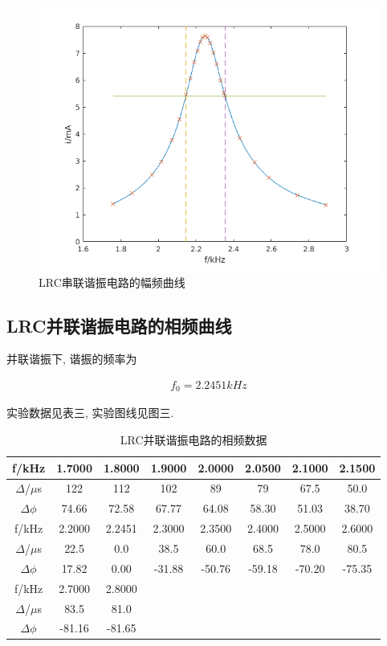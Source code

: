 \documentclass[a4paper,12pt,notitlepage]{article}
\begin{document}
\begin{figure}[H]
\centering
	\includegraphics[scale=0.7]{exp14_2.png}
	\caption{LRC串联谐振电路的幅频曲线}
\end{figure}

\subsection{LRC并联谐振电路的相频曲线}

	并联谐振下, 谐振的频率为
	
\begin{align*}
	f_0 = 2.2451kHz
\end{align*}

\begin{center}

	实验数据见表三, 实验图线见图三. \\

	\begin{longtable}{|c|c|c|c|c|c|c|c|}
	\caption{LRC并联谐振电路的相频数据} \\
	\hline
	f/kHz & 1.7000 & 1.8000 & 1.9000 & 2.0000 & 2.0500 & 2.1000 & 2.1500 \\
	\hline
	$\Delta$/$\mu$s & 122 & 112 & 102 & 89 & 79 & 67.5 & 50.0 \\
	\hline
	$\Delta\phi$ & 74.66 & 72.58 & 67.77 & 64.08 & 58.30 & 51.03 & 38.70 \\
	\hline
	\hline
	f/kHz & 2.2000 & 2.2451 & 2.3000 & 2.3500 & 2.4000 & 2.5000 & 2.6000 \\
	\hline
	$\Delta$/$\mu$s & 22.5 & 0.0 & 38.5 & 60.0 & 68.5 & 78.0 & 80.5 \\
	\hline
	$\Delta\phi$ & 17.82 & 0.00 & -31.88 & -50.76 & -59.18 & -70.20 & -75.35 \\
	\hline
	\hline
	f/kHz & 2.7000 & 2.8000 & & & & &  \\
	\hline
	$\Delta$/$\mu$s & 83.5 & 81.0 & & & &  & \\
	\hline
	$\Delta\phi$ & -81.16 & -81.65 & & & & & \\
	\hline
	\end{longtable}

\end{center}
\end{document}
